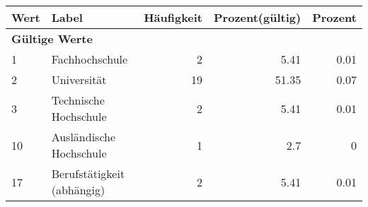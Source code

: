      \begin{longtable}{lXrrr}
     \toprule
     \textbf{Wert} & \textbf{Label} & \textbf{Häufigkeit} & \textbf{Prozent(gültig)} & \textbf{Prozent} \\
     \endhead
     \midrule
     \multicolumn{5}{l}{\textbf{Gültige Werte}}\\

     1 &
     \multicolumn{1}{X}{ Fachhochschule   } &


       \num{2} &
       \num[round-mode=places,round-precision=2]{5,41} &
         \num[round-mode=places,round-precision=2]{0,01} \\

     2 &
     \multicolumn{1}{X}{ Universität   } &


       \num{19} &
       \num[round-mode=places,round-precision=2]{51,35} &
         \num[round-mode=places,round-precision=2]{0,07} \\

     3 &
     \multicolumn{1}{X}{ Technische Hochschule   } &


       \num{2} &
       \num[round-mode=places,round-precision=2]{5,41} &
         \num[round-mode=places,round-precision=2]{0,01} \\

     10 &
     \multicolumn{1}{X}{ Ausländische Hochschule   } &


       \num{1} &
       \num[round-mode=places,round-precision=2]{2,7} &
         \num[round-mode=places,round-precision=2]{0} \\

     17 &
     \multicolumn{1}{X}{ Berufstätigkeit (abhängig)   } &


       \num{2} &
       \num[round-mode=places,round-precision=2]{5,41} &
         \num[round-mode=places,round-precision=2]{0,01} \\


\end{longtable}
